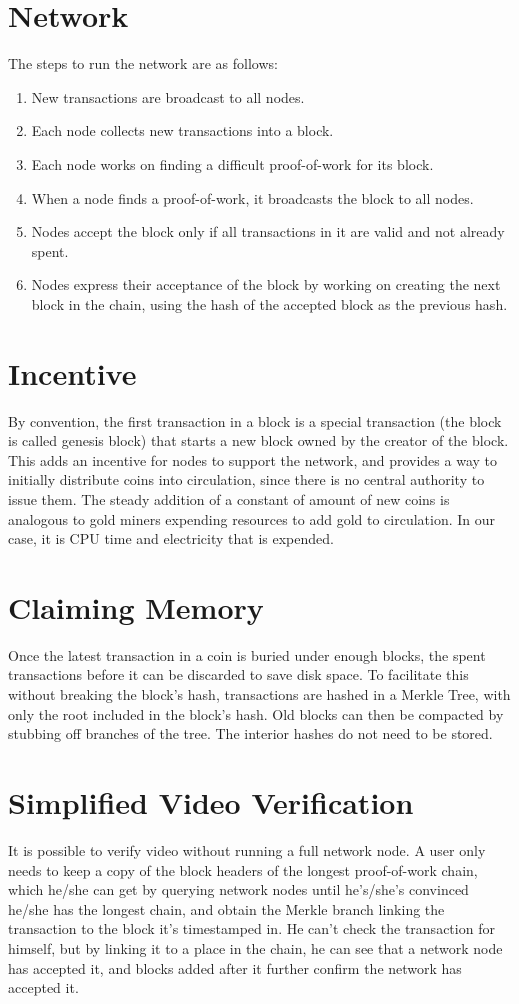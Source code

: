 \documentclass[a4paper,12pt]{report}
\begin{document}
\section{Network}
The steps to run the network are as follows:
\begin{enumerate}
\item New transactions are broadcast to all nodes.
\item Each node collects new transactions into a block.
\item Each node works on finding a difficult proof-of-work for its block.
\item When a node finds a proof-of-work, it broadcasts the block to all nodes.
\item Nodes accept the block only if all transactions in it are valid and not already spent.
\item Nodes express their acceptance of the block by working on creating the next block in the chain, using the hash of the accepted block as the previous hash.
\end{enumerate}

\section{Incentive}
By convention, the first transaction in a block is a special transaction (the block is called genesis block) that starts a new block owned
by the creator of the block. This adds an incentive for nodes to support the network, and provides
a way to initially distribute coins into circulation, since there is no central authority to issue them.
The steady addition of a constant of amount of new coins is analogous to gold miners expending
resources to add gold to circulation. In our case, it is CPU time and electricity that is expended.

\section{Claiming Memory}
Once the latest transaction in a coin is buried under enough blocks, the spent transactions before
it can be discarded to save disk space. To facilitate this without breaking the block's hash,
transactions are hashed in a Merkle Tree, with only the root included in the block's hash.
Old blocks can then be compacted by stubbing off branches of the tree. The interior hashes do
not need to be stored.

\section{Simplified Video Verification}
It is possible to verify video without running a full network node. A user only needs to keep
a copy of the block headers of the longest proof-of-work chain, which he/she can get by querying
network nodes until he's/she's convinced he/she has the longest chain, and obtain the Merkle branch
linking the transaction to the block it's timestamped in. He can't check the transaction for
himself, but by linking it to a place in the chain, he can see that a network node has accepted it,
and blocks added after it further confirm the network has accepted it.
\end{document}
